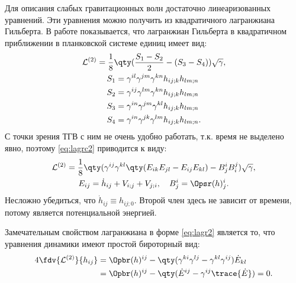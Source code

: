 \documentclass[\docroot/reports/draft/report.tex]{subfiles}
\begin{document}
    Для описания слабых гравитационных волн достаточно линеаризованных уравнений. Эти уравнения можно получить из квадратичного лагранжиана Гильберта. В работе \cite{burlankov_grav_waves} показывается, что лагранжиан Гильберта в квадратичном приближении в планковской системе единиц имеет вид:
    \begin{equation}\label{eq:lagrc2}
        \begin{gathered}
            \mathcal{L}^{(2)} = \frac{1}{8} \qty(
                \frac{S_1 - S_2}{2} - (S_3 - S_4)
            ) \sqrt{\gamma}, \\
            \begin{aligned}
                S_1 &= \gamma^{il}\gamma^{jm}\gamma^{kn} h_{ij;k} h_{lm;n} \\
                S_2 &= \gamma^{ij}\gamma^{lm}\gamma^{kn} h_{ij;k} h_{lm;n} \\
                S_3 &= \gamma^{in}\gamma^{jm}\gamma^{kl} h_{ij;k} h_{lm;n} \\
                S_4 &= \gamma^{in}\gamma^{jk}\gamma^{lm} h_{ij;k} h_{lm;n} .
            \end{aligned}
        \end{gathered}
    \end{equation}
    С точки зрения ТГВ с ним не очень удобно работать, т.к. время не выделено явно, поэтому \autoref{eq:lagrc2} приводится к виду:
    \begin{equation}\label{eq:lagr2}
        \begin{gathered}
            \mathcal{L}^{(2)} = \frac{1}{8} \qty(
                \gamma^{ij} \gamma^{kl} \qty(
                    E_{ik} E_{jl} - E_{ij} E_{kl}
                ) - B^i_j B^j_i
            ) \sqrt{\gamma}, \\
            E_{ij} = \dot{h}_{ij} + V_{i;j} + V_{j;i}, \quad
            B^i_j = \Opsr(h)^i_j .
        \end{gathered}
    \end{equation}
    Несложно убедиться, что $\dot{h}_{ij} \equiv h_{ij;0}$. Второй член здесь не зависит от времени, потому является потенциальной энергией.

    Замечательным свойством лагранжиана в форме \autoref{eq:lagr2} является то, что уравнения динамики имеют простой бироторный вид:
    \begin{equation}\begin{aligned}\label{eq:lagr2var}
        4\fdv{\mathcal{L}^{(2)}}{h_{ij}} &= \Opbr(h)^{ij} -
        \qty(\gamma^{ki}\gamma^{lj} - \gamma^{kl}\gamma^{ij}) \dot{E}_{kl} \\
                   &= \Opbr(h)^{ij} - \qty(\dot{E}^{ij} - \gamma^{ij} \trace{\dot{E}}) = 0.
    \end{aligned}\end{equation}
\end{document}
